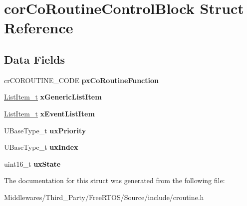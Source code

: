 \hypertarget{structcor_co_routine_control_block}{}\section{cor\+Co\+Routine\+Control\+Block Struct Reference}
\label{structcor_co_routine_control_block}
\subsection*{Data Fields}
\begin{DoxyCompactItemize}
\item 
\mbox{\label{structcor_co_routine_control_block_aa842d81ed7b4c345cf52cde20c5b22e5}} 
cr\+C\+O\+R\+O\+U\+T\+I\+N\+E\+\_\+\+C\+O\+DE {\bfseries px\+Co\+Routine\+Function}
\item 
\mbox{\label{structcor_co_routine_control_block_ad91115e6e382ba8961310c4559abc7d2}} 
\mbox{\hyperlink{structx_l_i_s_t___i_t_e_m}{List\+Item\+\_\+t}} {\bfseries x\+Generic\+List\+Item}
\item 
\mbox{\label{structcor_co_routine_control_block_a139605d93d834601f34be927ecba3a15}} 
\mbox{\hyperlink{structx_l_i_s_t___i_t_e_m}{List\+Item\+\_\+t}} {\bfseries x\+Event\+List\+Item}
\item 
\mbox{\label{structcor_co_routine_control_block_a0befed3dd0fe55b4314158f4814f50ae}} 
U\+Base\+Type\+\_\+t {\bfseries ux\+Priority}
\item 
\mbox{\label{structcor_co_routine_control_block_a0a9f1b8d3c0676d256f119fdc5fddfb5}} 
U\+Base\+Type\+\_\+t {\bfseries ux\+Index}
\item 
\mbox{\label{structcor_co_routine_control_block_a40a191332ff98e1969a821b870f59531}} 
uint16\+\_\+t {\bfseries ux\+State}
\end{DoxyCompactItemize}


The documentation for this struct was generated from the following file\+:\begin{DoxyCompactItemize}
\item 
Middlewares/\+Third\+\_\+\+Party/\+Free\+R\+T\+O\+S/\+Source/include/croutine.\+h\end{DoxyCompactItemize}
